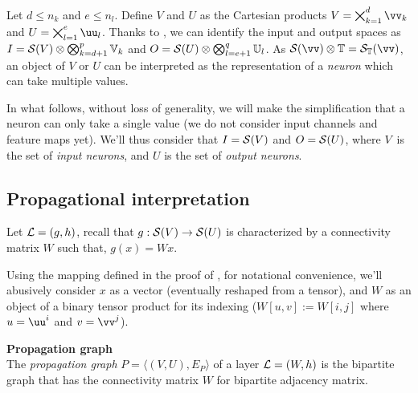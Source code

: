 Let $d \le n_k$ and $e \le n_l$. Define $V$ and $U$ as the Cartesian products $V = \bigtimes_{k=1}^d \vv_k$ and $U = \bigtimes_{l=1}^e \uu_l$. Thanks to , we can identify the input and output spaces as $I = \mathcal{S}(V) \otimes \bigotimes_{k=d+1}^p \mathbb{V}_k$ and $O = \mathcal{S}(U) \otimes \bigotimes_{l=e+1}^q \mathbb{U}_l$. As $\cs(\vv) \otimes \bbt = \cs_{\bbt}(\vv)$, an object of $V$ or $U$ can be interpreted as the representation of a \emph{neuron} which can take multiple values.

\vspace{10pt}
In what follows, without loss of generality, we will make the simplification that a neuron can only take a single value (we do not consider input channels and feature maps yet). We'll thus consider that $I = \mathcal{S}(V)$ and $O = \mathcal{S}(U)$, where $V$~is the set of \emph{input neurons}, and $U$ is the set of \emph{output neurons}.

\subsection{Propagational interpretation}

Let $\mathcal{L} = (g,h)$, recall that $g: \mathcal{S}(V) \rightarrow \mathcal{S}(U)$ is characterized by a connectivity matrix $W$ such that, $g(x) = Wx$.

\begin{remark}Using the mapping defined in the proof of , for notational convenience, we'll abusively consider $x$ as a vector (eventually reshaped from a tensor), and $W$ as an object of a binary tensor product for its indexing (\ie $W[u,v] := W[i,j]$ where $u = \uu^i$ and $v = \vv^j$).
\end{remark}


\begin{definition}\textbf{Propagation graph}\\
The \emph{propagation graph} $P = \langle (V, U), E_P \rangle$ of a layer $\mathcal{L} = (W,h)$ is the bipartite graph that has the connectivity matrix $W$ for bipartite adjacency matrix.
\end{definition}

